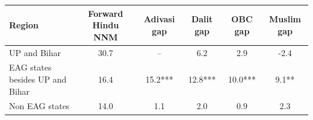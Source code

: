 \begin{tabular}{lccccc}
\hline
Region & Forward Hindu NNM & Adivasi gap & Dalit gap & OBC gap & Muslim gap \\
\hline
UP and Bihar&30.7&--&6.2&2.9&-2.4\\
EAG states besides UP and Bihar&16.4&15.2***&12.8***&10.0***&9.1**\\
Non EAG states&14.0&1.1&2.0&0.9&2.3\\
\hline
\end{tabular}
